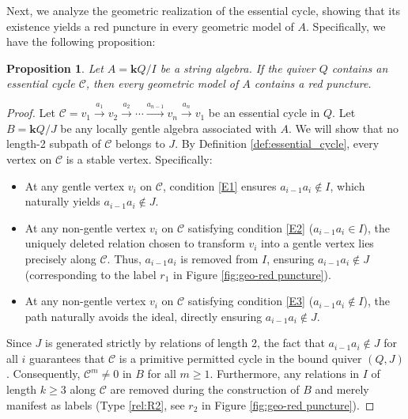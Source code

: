 \documentclass[11pt]{amsart}
\numberwithin{equation}{section}
\newtheorem{proposition}[theorem]{Proposition}
\theoremstyle{definition}
\begin{document}
Next, we analyze the geometric realization of the essential cycle, showing that its existence yields a red puncture in every geometric model of $A$. Specifically, we have the following proposition:


\begin{proposition}\label{prop: essential cycle}
    Let $A=\mathbf{k}Q/I$ be a string algebra. If the quiver $Q$ contains an essential cycle $\mathcal{C}$, then every geometric model of $A$ contains a red puncture. 
\end{proposition} 

\begin{proof}
Let $\mathcal{C} = v_1 \xrightarrow{a_1} v_2 \xrightarrow{a_2} \cdots \xrightarrow{a_{n-1}} v_n \xrightarrow{a_n} v_1$ be an essential cycle in $Q$. Let $B=\mathbf{k}Q/J$ be any locally gentle algebra associated with $A$. We will show that no length-2 subpath of $\mathcal{C}$ belongs to $J$. By Definition \ref{def:essential_cycle}, every vertex on $\mathcal{C}$ is a stable vertex. Specifically:
\begin{itemize}
    \item At any gentle vertex $v_i$ on $\mathcal{C}$, condition \ref{E1} ensures $a_{i-1}a_i \notin I$, which naturally yields $a_{i-1}a_i \notin J$.
    \item At any non-gentle vertex $v_i$ on $\mathcal{C}$ satisfying condition \ref{E2} ($a_{i-1}a_i \in I$), the uniquely deleted relation chosen to transform $v_i$ into a gentle vertex lies precisely along $\mathcal{C}$. Thus, $a_{i-1}a_i$ is removed from $I$, ensuring $a_{i-1}a_i \notin J$ (corresponding to the label $r_1$ in Figure \ref{fig:geo-red puncture}).
    \item At any non-gentle vertex $v_i$ on $\mathcal{C}$ satisfying condition \ref{E3} ($a_{i-1}a_i \notin I$), the path naturally avoids the ideal, directly ensuring $a_{i-1}a_i \notin J$.
\end{itemize}

Since $J$ is generated strictly by relations of length 2, the fact that $a_{i-1}a_i \notin J$ for all $i$ guarantees that $\mathcal{C}$ is a primitive permitted cycle in the bound quiver $(Q, J)$. Consequently, $\mathcal{C}^m \neq 0$ in $B$ for all $m \ge 1$. Furthermore, any relations in $I$ of length $k \ge 3$ along $\mathcal{C}$ are removed during the construction of $B$ and merely manifest as labels (Type \ref{rel:R2}, see $r_2$ in Figure \ref{fig:geo-red puncture}). 


\end{proof}
\end{document}
